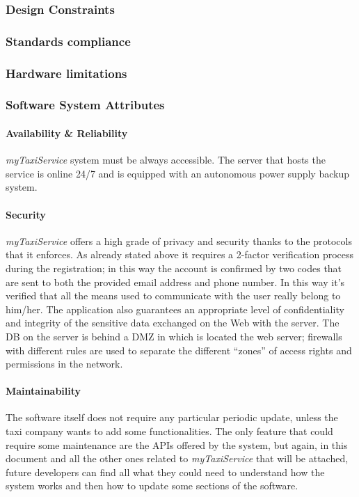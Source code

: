 \documentclass[a4paper,11pt]{report} %
\newcommand{\mts}{\mbox{\normalfont\itshape myTaxiService}}
\begin{document}
	\subsubsection{Design Constraints}
		
	\subsubsection{Standards compliance}
	
	\subsubsection{Hardware limitations}
	
	\subsubsection{Software System Attributes}
	
	\paragraph{Availability \& Reliability} \mts{} system must be always accessible. The server that hosts the service is online 24/7 and is equipped with an autonomous power supply backup system.
	
	\paragraph{Security} \mts{} offers a high grade of privacy and security thanks to the protocols that it enforces. As already stated above it requires a 2-factor verification process during the registration; in this way the account is confirmed by two codes that are sent to both the provided email address and phone number. In this way it's verified that  all the means used to communicate with the user really belong to him/her. The application also guarantees an appropriate level of confidentiality and integrity of the sensitive data exchanged on the Web with the server. The DB on the server is behind a DMZ in which is located the web server; firewalls with different rules are used to separate the different ``zones'' of access rights and permissions in the network.
	
	\paragraph{Maintainability} The software itself does not require any particular periodic update, unless the taxi company wants to add some functionalities. The only feature that could require some maintenance are the APIs offered by the system, but again, in this document and all the other ones related to \mts{} that will be attached, future developers can find all what they could need to understand how the system works and then how to update some sections of the software. 
\end{document}
